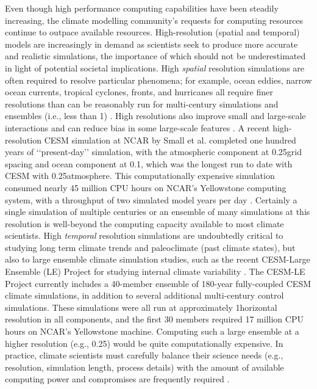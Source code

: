 
Even though high performance computing capabilities have been steadily increasing, the climate modelling community's requests for computing resources continue to outpace available resources.  High-resolution (spatial and temporal) models are increasingly in demand as scientists seek to produce more accurate and realistic simulations, the importance of which should not be underestimated in light of potential societal implications.  High \textit{spatial} resolution simulations are often required to resolve particular phenomena; for example, ocean eddies, narrow ocean currents, tropical cyclones, fronts, and hurricanes all require finer resolutions than can be reasonably run for multi-century simulations and ensembles (i.e., less than 1\degree) \cite{washington2009, small2014}.  High resolutions also improve small and large-scale interactions and can reduce bias in some large-scale features \cite{small2014}.  A recent high-resolution CESM simulation at NCAR by Small et al. \cite{small2014} completed one hundred years of ‘‘present-day’’ simulation, with the atmospheric component at 0.25\degree grid spacing and ocean component at 0.1\degree, which was the longest run to date with CESM with 0.25\degree atmosphere.  This computationally expensive simulation consumed nearly 45 million CPU hours on NCAR's Yellowstone computing system, with a throughput of two simulated model years per day \cite{small2014}. Certainly a single simulation of multiple centuries or an ensemble of many simulations at this resolution is well-beyond the computing capacity available to most climate scientists.  High \textit{temporal} resolution simulations are undoubtedly critical to studying long term climate trends and paleoclimate (past climate states), but also to large ensemble climate simulation studies, such as the recent CESM-Large Ensemble (LE) Project for studying internal climate variability \citep{kay2015}.  The CESM-LE Project currently includes a 40-member ensemble of 180-year fully-coupled CESM climate simulations, in addition to several additional multi-century control simulations.  These simulations were all run at approximately 1\degree horizontal resolution in all components, and the first 30 members required 17 million CPU hours on NCAR's Yellowstone machine.  Computing such a large ensemble at a higher resolution (e.g., 0.25\degree) would be quite computationally expensive.
In practice, climate scientists must carefully balance their science needs (e.g., resolution, simulation length, process details) with the amount of available computing power and compromises are frequently required \cite{washington2009}.  

